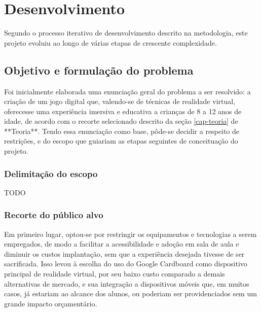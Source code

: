 
\chapter{Desenvolvimento}\label{cap-desenvolvimento}

Segundo o processo iterativo de desenvolvimento descrito na metodologia, este projeto evoluiu ao longo de várias etapas de crescente complexidade.


\section{Objetivo e formulação do problema}\label{sec-objetivos-formulacao-problema}

Foi inicialmente elaborada uma enunciação geral do problema a ser resolvido: a criação de um jogo digital que, valendo-se de técnicas de realidade virtual, oferecesse uma experiência imersiva e educativa a crianças de 8 a 12 anos de idade, de acordo com o recorte selecionado descrito da seção \ref{cap-teoria} de **Teoria**. Tendo essa enunciação como base, pôde-se decidir a respeito de restrições, e do escopo que guiariam as etapas seguintes de conceituação do projeto.

\subsection{Delimitação do escopo}\label{subsec-delimitacao-escopo}
TODO

\subsection{Recorte do público alvo}\label{subsec-recorte-publico-alvo}

Em primeiro lugar, optou-se por restringir os equipamentos e tecnologias a serem empregados, de modo a facilitar a acessibilidade e adoção em sala de aula e diminuir os custos implantação, sem que a experiência desejada tivesse de ser sacrificada. Isso levou à escolha do uso do Google Cardboard como dispositivo principal de realidade virtual, por seu baixo custo comparado a demais alternativas de mercado, e sua integração a dispositivos móveis que, em muitos casos, já estariam ao alcance dos alunos, ou poderiam ser providenciados sem um grande impacto orçamentário.

